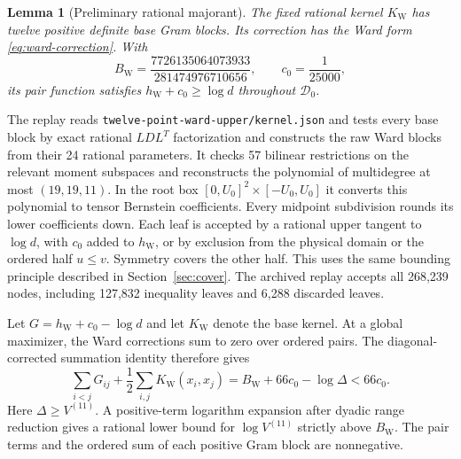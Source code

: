 \documentclass[11pt,letterpaper]{article}
\newtheorem{lemma}[theorem]{Lemma}
\theoremstyle{remark}
\begin{document}
\begin{lemma}[Preliminary rational majorant]\label{lem:preliminary}
The fixed rational kernel \(K_{\mathrm W}\) has twelve positive definite
base Gram blocks. Its correction has the Ward form
\eqref{eq:ward-correction}. With
\[
 B_{\mathrm W}=\frac{7726135064073933}{281474976710656},
 \qquad c_0=\frac1{25000},
\]
its pair function satisfies \(h_{\mathrm W}+c_0\ge\log d\) throughout
\(\mathcal D_0\).
\end{lemma}

The replay reads \texttt{twelve-point-ward-upper/}\allowbreak\texttt{kernel.json}
and tests every base block by exact rational \(LDL^T\)
factorization and constructs the raw Ward blocks from their 24 rational
parameters. It checks 57 bilinear restrictions on the relevant moment
subspaces and reconstructs the polynomial of multidegree at most
\((19,19,11)\). In the root box \([0,U_0]^2\times[-U_0,U_0]\) it converts
this polynomial to tensor Bernstein coefficients. Every midpoint
subdivision rounds its lower coefficients down. Each leaf is accepted
by a rational upper tangent to \(\log d\), with \(c_0\) added to
\(h_{\mathrm W}\), or by exclusion from the physical domain or the
ordered half \(u\le v\). Symmetry covers the other half. This uses the
same bounding principle described in Section~\ref{sec:cover}. The
archived replay accepts all 268,239 nodes, including 127,832 inequality
leaves and 6,288 discarded leaves.

Let \(G=h_{\mathrm W}+c_0-\log d\) and let \(K_{\mathrm W}\) denote the
base kernel. At a
global maximizer, the Ward corrections sum to zero over ordered pairs.
The diagonal-corrected summation identity therefore gives
\begin{equation}
 \sum_{i<j}G_{ij}+\frac12\sum_{i,j}K_{\mathrm W}(x_i,x_j)
 =B_{\mathrm W}+66c_0-\log\Delta
 <66c_0.
 \label{eq:domain-deficit}
\end{equation}
Here \(\Delta\ge V^{(11)}\). A positive-term logarithm expansion after
dyadic range reduction gives a rational lower bound for \(\log V^{(11)}\)
strictly above \(B_{\mathrm W}\). The pair terms and the ordered sum of
each positive Gram block are nonnegative.
\end{document}
